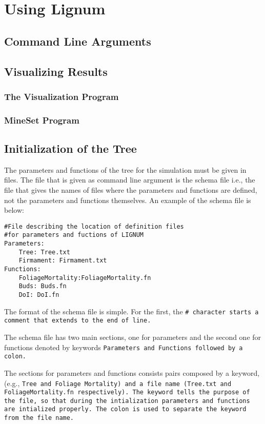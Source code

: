 \section{Using Lignum}
\subsection{Command Line Arguments}
\subsection{Visualizing Results}
\subsubsection{The Visualization Program}
\subsubsection{MineSet Program}

\subsection{Initialization of the Tree}

The parameters and functions of the tree for the simulation 
must be given in files. The file that is given as command 
line argument is the schema file i.e., the file that gives the 
names of files where the parameters and functions are defined, 
not the parameters and functions themselves. An example of the schema file
is below:

\begin{verbatim}
#File describing the location of definition files
#for parameters and fuctions of LIGNUM
Parameters:
    Tree: Tree.txt 
    Firmament: Firmament.txt
Functions:
    FoliageMortality:FoliageMortality.fn
    Buds: Buds.fn
    DoI: DoI.fn
\end{verbatim}

The format of the schema file is simple. For the first, the \tt \# \rm
character starts a comment that extends to the end of line.  

The schema file has two main sections, one for parameters and
the second one for functions denoted by keywords 
\tt Parameters \rm and \tt Functions \rm followed by a colon.
 
The sections for parameters and functions consists pairs
composed by a keyword,(e.g., \tt Tree \rm and 
\tt Foliage Mortality\rm) and a file name
(\tt Tree.txt \rm and \tt FoliageMortality.fn \rm respectively). 
The keyword tells the purpose of the file, so that
during the intialization parameters and functions are
intialized properly. The colon is used to separate the
keyword from the file name.

